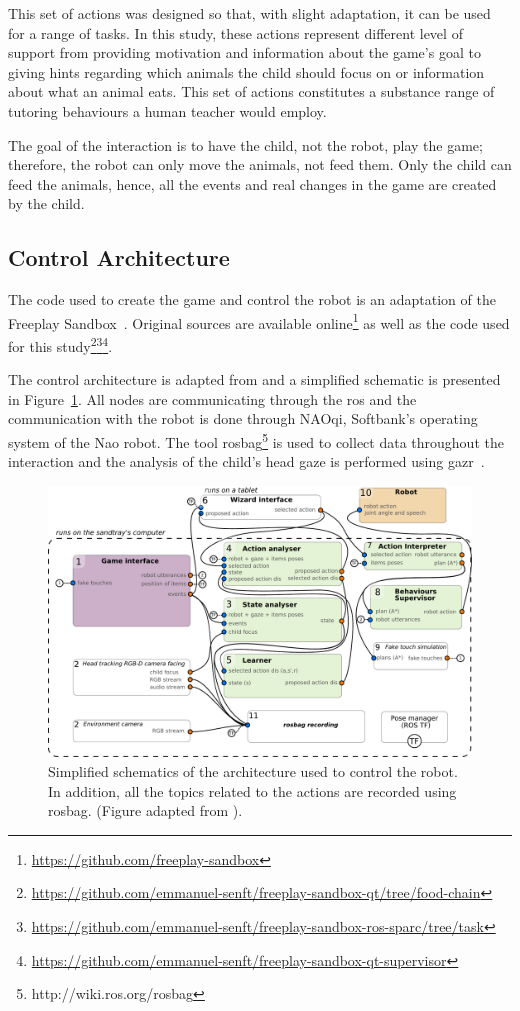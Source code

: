 This set of actions was designed so that, with slight adaptation, it can be used for a range of tasks. In this study, these actions represent different level of support from providing motivation and information about the game's goal to giving hints regarding which animals the child should focus on or information about what an animal eats. This set of actions constitutes a substance range of tutoring behaviours a human teacher would employ.

The goal of the interaction is to have the child, not the robot, play the game; therefore, the robot can only move the animals, not feed them. Only the child can feed the animals, hence, all the events and real changes in the game are created by the child. 
\subsection{Control Architecture}

The code used to create the game and control the robot is an adaptation of the Freeplay Sandbox~\citep{lemaignan2017free}. Original sources are available online\footnote{\url{https://github.com/freeplay-sandbox}} as well as the code used for this study\footnote{\url{https://github.com/emmanuel-senft/freeplay-sandbox-qt/tree/food-chain}}\footnote{\url{https://github.com/emmanuel-senft/freeplay-sandbox-ros-sparc/tree/task}}\footnote{\url{https://github.com/emmanuel-senft/freeplay-sandbox-qt-supervisor}}.

The control architecture is adapted from \cite{lemaignan2017free} and a simplified schematic is presented in Figure~\ref{fig:tutoring_arch}. All nodes are communicating through the \gls{ros} \citep{quigley2009ros} and the communication with the robot is done through NAOqi, Softbank's operating system of the Nao robot. The tool rosbag\footnote{http://wiki.ros.org/rosbag} is used to collect data throughout the interaction and the analysis of the child's head gaze is performed using gazr~\citep{lemaignan2016real}.

\begin{figure}[ht]
	\centering
	\includegraphics[width=1\textwidth]{architecture.pdf}
	\caption{Simplified schematics of the architecture used to control the robot. In addition, all the topics related to the actions are recorded using rosbag. (Figure adapted from \cite{lemaignan2017free}).}
	\label{fig:tutoring_arch}
\end{figure}

